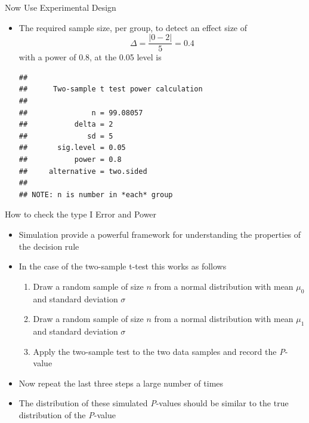 \documentclass[xcolor=x11names,compress]{beamer}\usepackage[]{graphicx}\usepackage[]{color}
\makeatletter
\newenvironment{kframe}{%
 \def\at@end@of@kframe{}%
 \ifinner\ifhmode%
  \def\at@end@of@kframe{\end{minipage}}%
  \begin{minipage}{\columnwidth}%
 \fi\fi%
 \def\FrameCommand##1{\hskip\@totalleftmargin \hskip-\fboxsep
 \colorbox{shadecolor}{##1}\hskip-\fboxsep
     \hskip-\linewidth \hskip-\@totalleftmargin \hskip\columnwidth}%
 \MakeFramed {\advance\hsize-\width
   \@totalleftmargin\z@ \linewidth\hsize
   \@setminipage}}%
 {\par\unskip\endMakeFramed%
 \at@end@of@kframe}
\newenvironment{knitrout}{}{} %
\makeatother
\begin{document}
\begin{frame}[fragile]{Now Use Experimental Design}
  \begin{itemize}
  \item The required sample size, per group, to detect an effect size of
      \begin{equation*}
      \Delta=\frac{|0-2|}{5}=0.4
    \end{equation*}
    with a power of 0.8, at the 0.05 level is
\begin{knitrout}\tiny
{}\color{fgcolor}\begin{kframe}
\begin{verbatim}
## 
##      Two-sample t test power calculation 
## 
##               n = 99.08057
##           delta = 2
##              sd = 5
##       sig.level = 0.05
##           power = 0.8
##     alternative = two.sided
## 
## NOTE: n is number in *each* group
\end{verbatim}
\end{kframe}
\end{knitrout}
  \end{itemize}
  
\end{frame}

\begin{frame}{How to check the type I Error and Power}
  \begin{itemize}
  \item Simulation provide a powerful framework for understanding
        the properties of the decision rule
  \item In the case of the two-sample t-test this works as follows
    \begin{enumerate}
    \item Draw a random sample of size $n$ 
          from a normal distribution with mean $\mu_0$ and
          standard deviation $\sigma$
    \item Draw a random sample of size $n$ 
          from a normal distribution with mean $\mu_1$ and
          standard deviation $\sigma$
    \item Apply the two-sample test to the two data samples and
          record the {\it P}-value
    \end{enumerate}
  \item Now repeat the last three steps a large number of times
  \item The distribution of these simulated {\it P}-values
        should be similar to the true distribution of the  {\it P}-value
  \end{itemize}
\end{frame}
\end{document}

